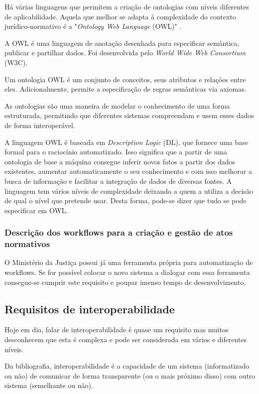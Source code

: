 Há várias linguagens que permitem a criação de ontologias com níveis diferentes de aplicabilidade.
Aquela que melhor se adapta à complexidade do contexto jurídico-normativo é a "\emph{Ontology Web Language} (OWL)" 
\cite{owl,owl2}.

A OWL é uma linguagem de anotação desenhada para especificar semântica, publicar e partilhar dados. 
Foi desenvolvida pelo \emph{World Wide Web Consortium} (W3C).

Um ontologia OWL é um conjunto de conceitos, seus atributos e relações entre eles. 
Adicionalmente, permite a especificação de regras semânticas via axiomas.

As ontologias são uma maneira de modelar o conhecimento de uma forma estruturada, permitindo que diferentes sistemas 
compreendam e usem esses dados de forma interoperável.

A linguagem OWL é baseada em \emph{Description Logic} (DL), que fornece uma base formal para o raciocínio automatizado. 
Isso significa que a partir de uma ontologia de base a máquina consegue inferir novos fatos a partir dos dados existentes, 
aumentar automaticamente o seu conhecimento e com isso 
melhorar a busca de informação e facilitar a integração de dados de diversas fontes.
A linguagem tem vários níveis de complexidade deixando a quem a utiliza a decisão de qual o nível que pretende usar. 
Desta forma, pode-se dizer que tudo se pode especificar em OWL.

\subsubsection{Descrição dos workflows para a criação e gestão de atos normativos}

O Ministério da Justiça possui já uma ferramenta própria para automatização de workflows. 
Se for possível colocar o novo sistema a dialogar com essa ferramenta consegue-se cumprir este requisito e 
poupar imenso tempo de desenvolvimento.


\subsection{Requisitos de interoperabilidade}

Hoje em dia, falar de interoperabilidade é quase um requisito mas muitos desconhecem que esta é complexa 
e pode ser considerada em vários e diferentes níveis.

Da bibliografia, interoperabilidade é a capacidade de um sistema (informatizado ou não) de comunicar de 
forma transparente (ou o mais próximo disso) com outro sistema (semelhante ou não).

